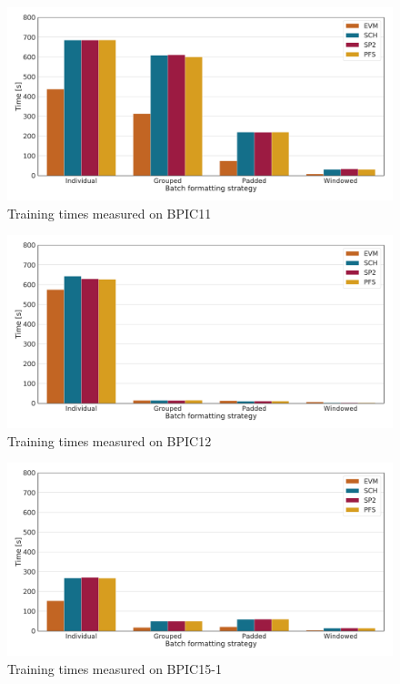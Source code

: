 \begin{figure}
    \centering
    \includegraphics[width=\textwidth]{gfx/bpic2011/train_timings.pdf}
    \caption{Training times measured on BPIC11}
    \label{fig:BPIC11-training-timings}
\end{figure}
\begin{figure}
    \centering
    \includegraphics[width=\textwidth]{gfx/bpic2012/train_timings.pdf}
    \caption{Training times measured on BPIC12}
    \label{fig:BPIC12-training-timings}
\end{figure}
\begin{figure}
    \centering
    \includegraphics[width=\textwidth]{gfx/bpic2015_1/train_timings.pdf}
    \caption{Training times measured on BPIC15-1}
    \label{fig:BPIC15-1-training-timings}
\end{figure}

